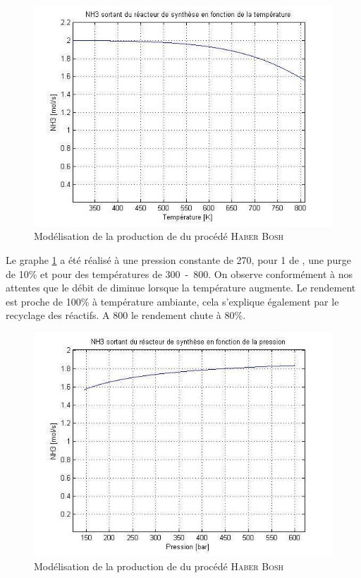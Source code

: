 \begin{figure}
	\centering
	\includegraphics[scale=0.5]{media/purgeTemperature.jpg} 
	\caption{Modélisation de la production de  du procédé \textsc{Haber Bosh}}
	\label{fig:purgeTemperature}
\end{figure}

Le graphe \ref{fig:purgeTemperature} a été réalisé à une pression constante de \unit{270}{\bbar}, pour \unit{1}{\mole\per\second} de , une purge de 10\% et pour des températures de \unit{300-800}{\kelvin}. On observe conformément à nos attentes que le débit de  diminue lorsque la température augmente. Le rendement est proche de 100\% à température ambiante, cela s'explique également par le recyclage des réactifs. A \unit{800}{\kelvin} le rendement chute à 80\%.

\begin{figure}
	\centering
	\includegraphics[scale=0.5]{media/purgePression.jpg} 
	\caption{Modélisation de la production de  du procédé \textsc{Haber Bosh}}
	\label{fig:purgePression}
\end{figure}

